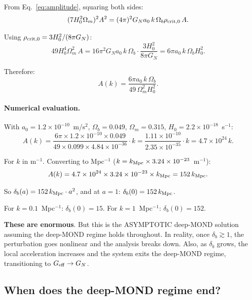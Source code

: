 \documentclass[11pt]{article}
\newcommand{\ee}[1]{\times 10^{#1}}
\newcommand{\Geff}{G_{\rm eff}}
\newcommand{\aM}{a_0}
\begin{document}
From Eq.~\eqref{eq:amplitude}, squaring both sides:
\begin{equation}
(7H_0^2\Omega_m)^2 A^2 = (4\pi)^2 G_N\aM\,k\,\Omega_b\rho_{\rm crit,0}\,A.
\end{equation}

Using $\rho_{\rm crit,0} = 3H_0^2/(8\pi G_N)$:
\begin{equation}
49 H_0^4\Omega_m^2\,A = 16\pi^2 G_N\aM\,k\,\Omega_b\cdot\frac{3H_0^2}{8\pi G_N}
= 6\pi\aM\,k\,\Omega_b H_0^2.
\end{equation}

Therefore:
\begin{equation}
A(k) = \frac{6\pi\aM\,k\,\Omega_b}{49\,\Omega_m^2 H_0^2}.
\label{eq:A-of-k}
\end{equation}

\paragraph{Numerical evaluation.}
With $\aM = 1.2\ee{-10}$~m/s$^2$, $\Omega_b = 0.049$,
$\Omega_m = 0.315$, $H_0 = 2.2\ee{-18}$~s$^{-1}$:
\begin{equation}
A(k) = \frac{6\pi\times 1.2\ee{-10}\times 0.049}{49\times 0.099\times 4.84\ee{-36}}\cdot k
= \frac{1.11\ee{-10}}{2.35\ee{-35}}\cdot k
= 4.7\ee{24}\,k.
\end{equation}

For $k$ in m$^{-1}$. Converting to Mpc$^{-1}$
($k = k_{\rm Mpc}\times 3.24\ee{-23}$~m$^{-1}$):
\begin{equation}
A(k) = 4.7\ee{24}\times 3.24\ee{-23}\times k_{\rm Mpc}
= 152\,k_{\rm Mpc}.
\end{equation}

So $\delta_b(a) = 152\,k_{\rm Mpc}\cdot a^2$, and at $a = 1$:
$\delta_b(0) = 152\,k_{\rm Mpc}$.

For $k = 0.1$~Mpc$^{-1}$: $\delta_b(0) = 15$.
For $k = 1$~Mpc$^{-1}$: $\delta_b(0) = 152$.

\textbf{These are enormous}. But this is the ASYMPTOTIC deep-MOND
solution assuming the deep-MOND regime holds throughout. In reality,
once $\delta_b \gtrsim 1$, the perturbation goes nonlinear and the
analysis breaks down. Also, as $\delta_b$ grows, the local acceleration
increases and the system exits the deep-MOND regime, transitioning to
$\Geff \to G_N$.

\subsection{When does the deep-MOND regime end?}
\end{document}
